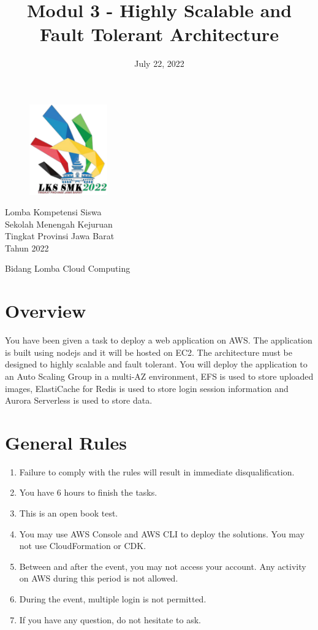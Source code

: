 \documentclass{article}
\title{Modul 3 - Highly Scalable and Fault Tolerant Architecture}
\author{}
\date{July 22, 2022}
\begin{document}
\begin{figure}[h]
\centering
\includegraphics[width=0.3\textwidth]{logo.png}
\end{figure}
\centering
{\huge
Lomba Kompetensi Siswa\\
Sekolah Menengah Kejuruan\\
Tingkat Provinsi Jawa Barat\\
Tahun 2022\\
\vspace{10mm} 
}
\vspace{30mm} 
{\let\newpage\relax\maketitle}
\vspace{30mm} 
{\LARGE Bidang Lomba Cloud Computing}

\thispagestyle{empty}
\newpage
\raggedright
{}

\section{Overview}
You have been given a task to deploy a web application on AWS. The application is built using nodejs and it will be hosted on EC2. The architecture must be designed to highly scalable and fault tolerant. You will deploy the application to an Auto Scaling Group in a multi-AZ environment, EFS is used to store uploaded images, ElastiCache for Redis is used to store login session information and Aurora Serverless is used to store data.

\section{General Rules}
\begin{enumerate}
    \item Failure to comply with the rules will result in immediate disqualification.
    \item You have 6 hours to finish the tasks.
    \item This is an open book test.
    \item You may use AWS Console and AWS CLI to deploy the solutions. You may not use CloudFormation or CDK.
    \item Between and after the event, you may not access your account. Any activity on AWS during this period is not allowed.
    \item During the event, multiple login is not permitted.
    \item If you have any question, do not hesitate to ask.
\end{enumerate}
\end{document}
